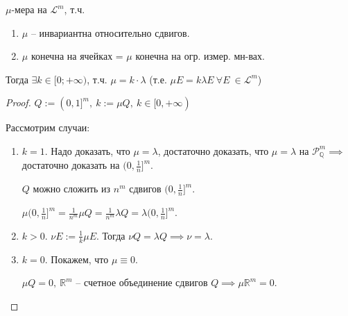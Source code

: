 \begin{theorem}
    $\mu$-мера на $\mathscr{L}^m$, т.ч.

    \begin{enumerate}
        \item {
            $\mu$ -- инвариантна относительно сдвигов.
        }
        \item {
            $\mu$ конечна на ячейках = $\mu$ конечна на огр. измер. мн-вах.
        }
    \end{enumerate}

    Тогда $\exists k \in [0; +\infty)$, т.ч. $\mu = k \cdot \lambda$ (т.е. $\mu E = k \lambda E \ \forall E \
    \in \mathscr{L}^m$)
\end{theorem}
\begin{proof}
    $Q := (0, 1]^m, \ k := \mu Q, \ k \in [0, +\infty)$

    Рассмотрим случаи:

    \begin{enumerate}
        \item {
            $k=1$. Надо доказать, что $\mu = \lambda$, достаточно доказать, что $\mu = \lambda$ на $\mathcal{P}^m_{\mathbb{Q}} \implies$ достаточно доказать на $(0, \frac{1}{n}]^m$.

            $Q$ можно сложить из $n^m$ сдвигов $(0, \frac{1}{n}]^m$.
            
            $\mu (0, \frac{1}{n}]^m = \frac{1}{n^m} \mu Q = \frac{1}{n^m} \lambda Q = \lambda (0, \frac{1}{n}]^m$.
        }
        \item {
            $k>0$. $\nu E := \frac{1}{k} \mu E$. Тогда $\nu Q = \lambda Q \implies \nu = \lambda$.
        }
        \item {
            $k = 0$. Покажем, что $\mu \equiv 0$.

            $\mu Q = 0, \ \mathbb{R}^m$ -- счетное объединение сдвигов $Q \implies \mu \mathbb{R}^m = 0$.
        }
    \end{enumerate}
\end{proof}

